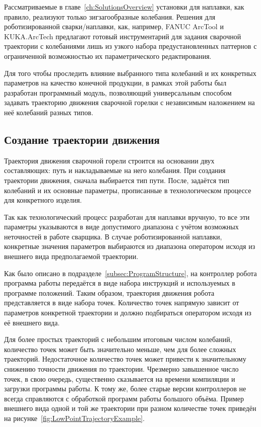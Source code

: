 Рассматриваемые в главе~\ref{ch:SolutionsOverview} установки для наплавки, как правило, реализуют только зигзагообразные колебания.
Решения для роботизированной сварки/наплавки, как, например, FANUC ArcTool и KUKA.ArcTech предлагают готовый инструментарий для задания сварочной траектории с колебаниями лишь из узкого набора предустановленных паттернов с ограниченной возможностью их параметрического редактирования.

Для того чтобы проследить влияние выбранного типа колебаний и их конкретных параметров на качество конечной продукции, в рамках этой работы был разработан программный модуль, позволяющий универсальным способом задавать траекторию движения сварочной горелки с независимым наложением на неё колебаний разных типов.

\subsection{Создание траектории движения}
Траектория движения сварочной горели строится на основании двух составляющих: путь и накладываемые на него колебания.
При создания траектории движения, сначала выбирается тип пути.
После, задаётся тип колебаний и их основные параметры, прописанные в технологическом процессе для конкретного изделия.

Так как технологический процесс разработан для наплавки вручную, то все эти параметры указываются в виде допустимого диапазона с учётом возможных неточностей в работе сварщика.
В случае роботизированной наплавки, конкретные значения параметров выбираются из диапазона оператором исходя из внешнего вида предполагаемой траектории.

Как было описано в подразделе~\ref{subsec:ProgramStructure}, на контроллер робота программа работы передаётся в виде набора инструкций и используемых в программе положений.
Таким образом, траектория движения робота представляется в виде набора точек.
Количество точек напрямую зависит от параметров конкретной траектории и должно подбираться оператором исходя из её внешнего вида.

Для более простых траекторий с небольшим итоговым числом колебаний, количество точек может быть значительно меньше, чем для более сложных траекторий.
Недостаточное количество точек может привести к значительному снижению точности движения по траектории.
Чрезмерно завышенное число точек, в свою очередь, существенно сказывается на времени компиляции и загрузки программы работы.
К тому же, более старые версии контроллеров не всегда справляются с обработкой программ работы большого объёма.
Пример внешнего вида одной и той же траектории при разном количестве точек приведён на рисунке~\ref{fig:LowPointTrajectoryExample}.

